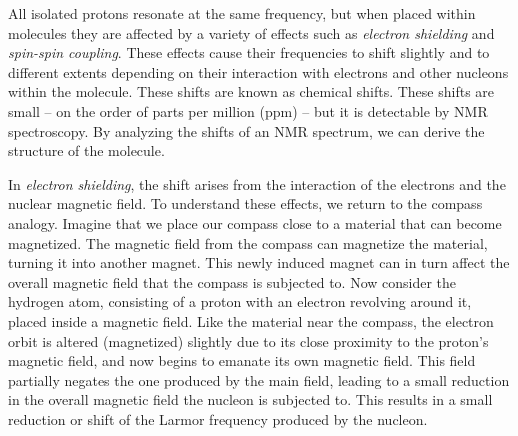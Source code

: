 All isolated protons resonate at the same frequency, but when placed within molecules they are affected by a variety of effects such as {\it electron shielding} and {\it spin-spin coupling}. These effects cause their frequencies to shift slightly and to different extents depending on their interaction with electrons and other nucleons within the molecule. These shifts are known as chemical shifts. These shifts are small -- on the order of parts per million (ppm) -- but it is detectable by NMR spectroscopy. By analyzing the shifts of an NMR spectrum, we can derive the structure of the molecule.

In {\it electron shielding}, the shift arises from the interaction of the electrons and the nuclear magnetic field. To understand these effects, we return to the compass analogy.  Imagine that we place our compass close to a material that can become magnetized. The magnetic field from the compass can magnetize the material, turning it into another magnet. This newly induced magnet can in turn affect the overall magnetic field that the compass is subjected to. Now consider the hydrogen atom, consisting of a proton with an electron revolving around it, placed inside a magnetic field.  Like the material near the compass, the electron orbit is altered (magnetized) slightly due to its close proximity to the proton’s magnetic field, and now begins to emanate its own magnetic field. This field partially negates the one produced by the main field, leading to a small reduction in the overall magnetic field the nucleon is subjected to. This results in a small reduction or shift of the Larmor frequency produced by the nucleon.

